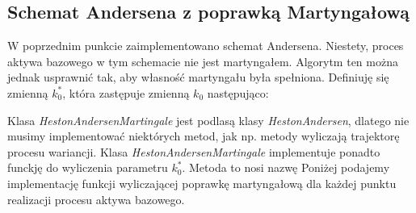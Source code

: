 \documentclass{pracamgr}
\begin{document}





\clearpage
\subsection{Schemat Andersena z poprawką Martyngałową}
W poprzednim punkcie zaimplementowano schemat Andersena. 
Niestety, proces aktywa bazowego w tym schemacie nie jest martyngałem.
Algorytm ten można jednak usprawnić tak, aby własność martyngału była spełniona.
Definiuję się zmienną $k_0^*$, która zastępuje zmienną $k_0$ następująco: 

Klasa \textit{HestonAndersenMartingale} jest podlasą klasy \textit{HestonAndersen}, 
dlatego nie musimy implementować niektórych metod, jak np. metody wyliczają trajektorę procesu
wariancji. 
Klasa \textit{HestonAndersenMartingale} implementuje ponadto funckję do wyliczenia parametru $k_0^*$.
Metoda to nosi nazwę Poniżej podajemy implementację funkcji wyliczającej poprawkę martyngałową 
dla każdej punktu realizacji procesu aktywa bazowego.




\clearpage
\end{document}
